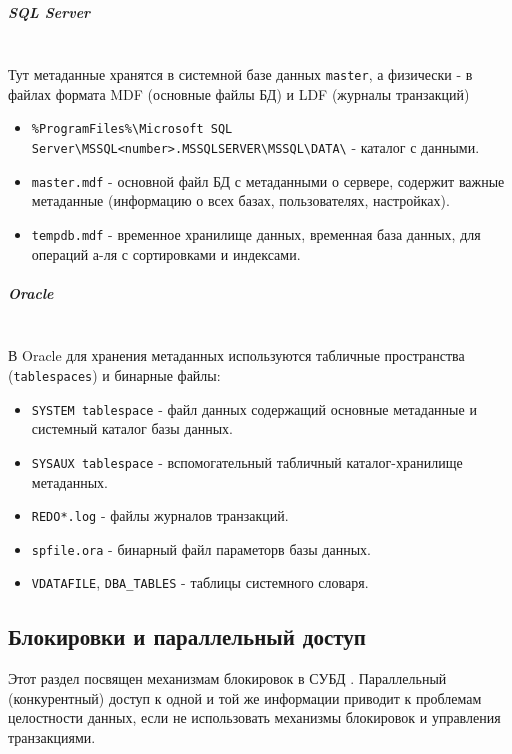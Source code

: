 \subparagraph{SQL Server} \autocite{MicrosoftLearnSQLserverMasterdb,MicrosoftLearnSQLserverTempdb,MicrosoftLearnSQLserverDBfiles,MicrosoftLearnSQLserverFileLoc} ~\\

Тут метаданные хранятся в системной базе данных \texttt{master}, а физически - в файлах формата MDF (основные файлы БД) и LDF (журналы транзакций)

\begin{itemize}
    \item \texttt{\%ProgramFiles\%\textbackslash{}Microsoft SQL Server\textbackslash{}MSSQL<number>.MSSQLSERVER\textbackslash{}MSSQL\textbackslash{}DATA\textbackslash{}} - каталог с данными.
    \item \texttt{master.mdf} - основной файл БД с метаданными о сервере, содержит важные метаданные (информацию о всех базах, пользователях, настройках).
    \item \texttt{tempdb.mdf} - временное хранилище данных, временная база данных, для операций а-ля с сортировками и индексами.
\end{itemize}


\subparagraph{Oracle} \autocites[§1.338]{oracledbdoc0}{oracledbdoc4}{OracleRedoLog} ~\\

В Oracle для хранения метаданных используются табличные пространства (\texttt{tablespaces}) и бинарные файлы:

\begin{itemize}
    \item \texttt{SYSTEM tablespace} - файл данных содержащий основные метаданные и системный каталог базы данных.
    \item \texttt{SYSAUX tablespace} - вспомогательный табличный каталог-хранилище метаданных.
    \item \texttt{REDO*.log} - файлы журналов транзакций.
    \item \texttt{spfile.ora} - бинарный файл параметорв базы данных.
    \item \texttt{V\textdollar DATAFILE}, \texttt{DBA\_TABLES} - таблицы системного словаря.
\end{itemize}

\subsection{Блокировки и параллельный доступ}

Этот раздел посвящен механизмам блокировок в СУБД \autocites[c.22]{ElmasriNavathe}[c. 18]{Silberschatz}. Параллельный (конкурентный) доступ к одной и той же информации приводит к проблемам целостности данных, если не использовать механизмы блокировок и управления транзакциями.

